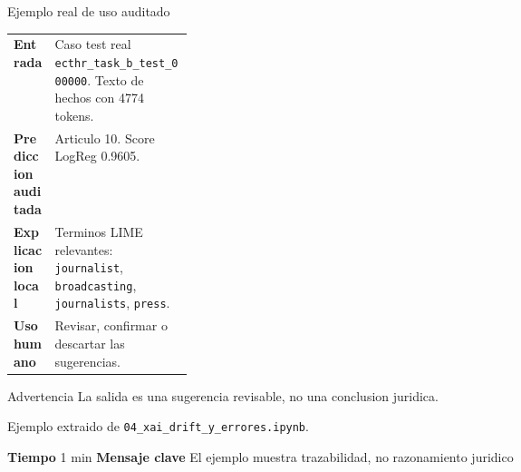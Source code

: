 \documentclass[aspectratio=169,10pt]{beamer}
\newcommand{\slidemeta}[2]{
  \vfill
  {\scriptsize\color{Muted}\textbf{Tiempo} #1 \hfill \textbf{Mensaje clave} #2}
}
\begin{document}
\begin{frame}{Ejemplo real de uso auditado}
  \small
  \begin{tabularx}{\linewidth}{>{\bfseries}p{0.23\linewidth}X}
    \toprule
    Entrada & Caso test real \texttt{ecthr\_task\_b\_test\_000000}. Texto de hechos con 4774 tokens.\\
    Prediccion auditada & Articulo 10. Score LogReg 0.9605.\\
    Explicacion local & Terminos LIME relevantes: \texttt{journalist}, \texttt{broadcasting}, \texttt{journalists}, \texttt{press}.\\
    Uso humano & Revisar, confirmar o descartar las sugerencias.\\
    \bottomrule
  \end{tabularx}
  \vspace{0.28cm}
  \begin{block}{Advertencia}
    La salida es una sugerencia revisable, no una conclusion juridica.
  \end{block}
  {\scriptsize\color{Muted}Ejemplo extraido de \texttt{04\_xai\_drift\_y\_errores.ipynb}.}
  \slidemeta{1 min}{El ejemplo muestra trazabilidad, no razonamiento juridico}
\end{frame}
\end{document}

